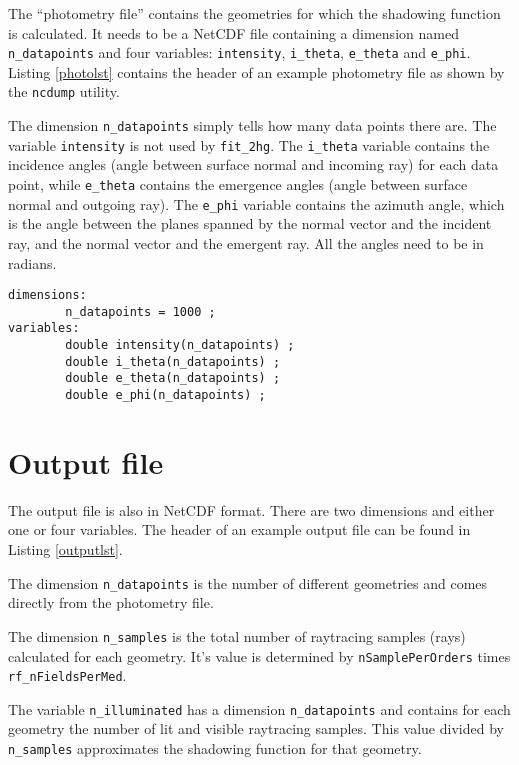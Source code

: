\documentclass[a4paper]{article}
\newcommand{\code}[1]{\lstinline{#1}}
\newcommand{\this}[0]{\texttt{fit\_2hg}}
\begin{document}
The ``photometry file'' contains the geometries for which the shadowing function is calculated. It needs to be a NetCDF file containing a dimension named \code{n_datapoints} and four variables: \code{intensity}, \code{i_theta}, \code{e_theta} and \code{e_phi}. Listing \ref{photolst} contains the header of an example photometry file as shown by the \code{ncdump} utility.

The dimension \code{n_datapoints} simply tells how many data points there are. The variable \code{intensity} is not used by \this. The \code{i_theta} variable contains the incidence angles (angle between surface normal and incoming ray) for each data point, while \code{e_theta} contains the emergence angles (angle between surface normal and outgoing ray). The \code{e_phi} variable contains the azimuth angle, which is the angle between the planes spanned by the normal vector and the incident ray, and the normal vector and the emergent ray. All the angles need to be in radians.

\begin{lstlisting}[float, frame=trbl, caption="Photometry file header", label=photolst]
dimensions:
        n_datapoints = 1000 ;
variables:
        double intensity(n_datapoints) ;
        double i_theta(n_datapoints) ;
        double e_theta(n_datapoints) ;
        double e_phi(n_datapoints) ;
\end{lstlisting}

\section{Output file}\label{output}

The output file is also in NetCDF format. There are two dimensions and either one or four variables. The header of an example output file can be found in Listing \ref{outputlst}. 

The dimension \code{n_datapoints} is the number of different geometries and comes directly from the photometry file. 

The dimension \code{n_samples} is the total number of raytracing samples (rays) calculated for each geometry. It's value is determined by \code{nSamplePerOrders} times \code{rf_nFieldsPerMed}.

The variable \code{n_illuminated} has a dimension \code{n_datapoints} and contains for each geometry the number of lit and visible raytracing samples. This value divided by \code{n_samples} approximates the shadowing function for that geometry.
\end{document}
